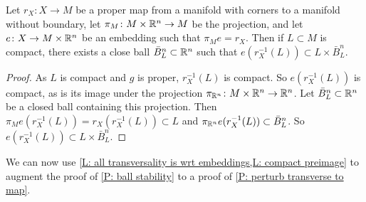 \begin{lemma}\label{L: compact preimage}
	Let $r_X \colon X \to M$ be a proper map from a manifold with corners to a manifold without boundary, let $\pi_M \colon M \times \mathbb{R}^n \to M$ be the projection, and let $e \colon X \to M \times \mathbb{R}^n$ be an embedding such that $\pi_Me = r_X$.
	Then if $L \subset M$ is compact, there exists a close ball $\bar B^n_L \subset \mathbb{R}^n$ such that $e(r_X^{-1}(L)) \subset L \times \bar B^n_L$.
\end{lemma}

\begin{proof}
	As $L$ is compact and $g$ is proper, $r_X^{-1}(L)$ is compact.
	So $e(r_X^{-1}(L))$ is compact, as is its image under the projection $\pi_{\mathbb{R}^n} \colon M \times \mathbb{R}^n \to \mathbb{R}^n$.
	Let $\bar B^n_L \subset \mathbb{R}^n$ be a closed ball containing this projection.
	Then $\pi_Me(r_X^{-1}(L)) = r_X(r_X^{-1}(L)) \subset L$ and $\pi_{\mathbb{R}^n}e(r_X^{-1}(L)) \subset \bar B^n_L$.
	So $e(r_X^{-1}(L)) \subset L \times \bar B^n_L$.
\end{proof}

We can now use \cref{L: all transversality is wrt embeddings,L: compact preimage} to augment the proof of \cref{P: ball stability} to a proof of \cref{P: perturb transverse to map}.


